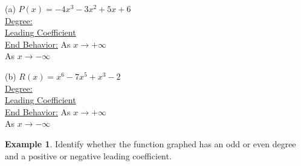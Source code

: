\documentclass{report}
\theoremstyle{definition}
\newtheorem{example}{\bf Example}
\begin{document}
\begin{minipage}[t]{0.45\linewidth}
(a) $P(x)=-4x^3-3x^2+5x+6$\\

\underline{Degree:}\\

\underline{Leading Coefficient}\\

\underline{End Behavior:} As $x\longrightarrow +\infty$\\


 \hspace{2.35cm }As $x\longrightarrow -\infty$
\end{minipage}
\hfill
\begin{minipage}[t]{0.45\linewidth}
(b) $R(x)=x^6-7x^5+x^3-2$\\

\underline{Degree:}\\

\underline{Leading Coefficient}\\

\underline{End Behavior:} As $x\longrightarrow +\infty$\\


 \hspace{2.35cm }As $x\longrightarrow -\infty$
\end{minipage}


 \newpage

\begin{example}
Identify whether the function graphed has an odd or even degree and a positive or negative leading coefficient.
\end{example}
\end{document}
